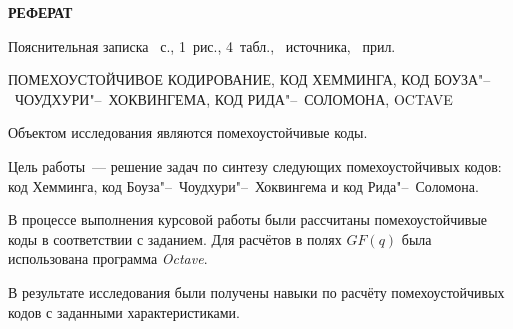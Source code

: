 \begin{center}
  \Large{\textbf{РЕФЕРАТ}}
\end{center}

Пояснительная записка ~с., 1~рис.,
4~табл., ~источника,
~прил.

ПОМЕХОУСТОЙЧИВОЕ КОДИРОВАНИЕ, КОД ХЕММИНГА, КОД
БОУЗА"--~ЧОУДХУРИ"--~ХОКВИНГЕМА, КОД РИДА"--~СОЛОМОНА, OCTAVE

Объектом исследования являются помехоустойчивые коды.

Цель работы~--- решение задач по синтезу следующих помехоустойчивых
кодов: код Хемминга, код Боуза"--~Чоудхури"--~Хоквингема и код
Рида"--~Соломона.

В процессе выполнения курсовой работы были рассчитаны помехоустойчивые
коды в соответствии с заданием. Для расчётов в полях $GF(q)$ была
использована программа \textit{Octave}.

В результате исследования были получены навыки по расчёту
помехоустойчивых кодов с заданными характеристиками.
\newpage


